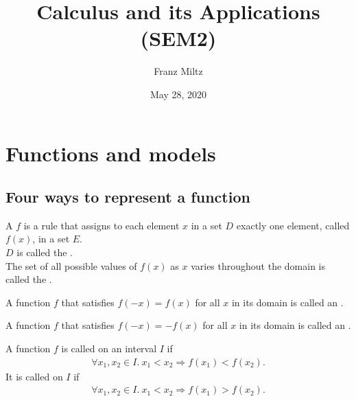 \documentclass{article}
\begin{document}
\title{Calculus and its Applications (SEM2)}
\author{Franz Miltz}
\date{May 28, 2020}
\maketitle
\tableofcontents
\pagebreak
\section{Functions and models}
\subsection{Four ways to represent a function}
\begin{definition}
    A  $f$ is a rule that assigns to each element $x$ in a set $D$ exactly one element, called $f(x)$, in a set $E$.\\
    $D$ is called the .\\
    The set of all possible values of $f(x)$ as $x$ varies throughout the domain is called the .\\
\end{definition}
\begin{definition}
    A function $f$ that satisfies $f(-x)=f(x)$ for all $x$ in its domain is called an .
\end{definition}
\begin{definition}
    A function $f$ that satisfies $f(-x)=-f(x)$ for all $x$ in its domain is called an .
\end{definition}
\begin{definition}
    A function $f$ is called  on an interval $I$ if
    \begin{align*}
        \forall x_1, x_2 \in I.\:x_1 < x_2 \Rightarrow f(x_1) < f(x_2).
    \end{align*}
    It is called  on $I$ if
    \begin{align*}
        \forall x_1, x_2 \in I.\: x_1 < x_2 \Rightarrow f(x_1) > f(x_2).
    \end{align*}
\end{definition}
\end{document}
